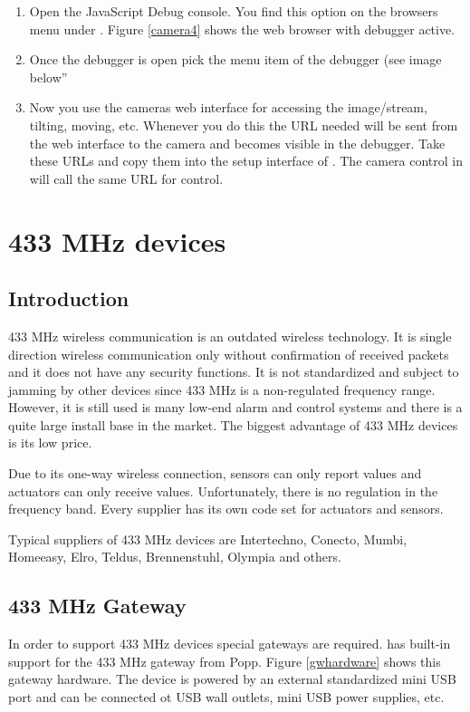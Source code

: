 \begin{enumerate}
\item Open the JavaScript Debug console. You find this option on the browsers menu under
. Figure \ref{camera4} shows the web browser with debugger active.
\item Once the debugger is open pick the menu item  of the debugger (see image below”
\item Now you use the cameras web interface for accessing the image/stream, tilting, moving, 
etc. Whenever you do this the URL needed will be sent from the web interface to the camera 
and becomes visible in the debugger. Take these URLs and copy them into the setup 
interface of . The camera control in \zwave will call the same URL for 
control.
\end{enumerate}

\section {433 MHz devices}

\subsection {Introduction}

433 MHz wireless communication is an outdated wireless technology. It is single direction 
wireless communication only without confirmation of received packets and it does not have 
any security functions. It is not standardized and subject to jamming by other devices 
since 433 MHz is a non-regulated frequency range. However, it is still used is many low-end 
alarm and control systems and there is a quite large install base in the market. The 
biggest advantage of 433 MHz devices is its low price.

Due to its one-way wireless connection, sensors can only report values and actuators can 
only receive values. Unfortunately, there is no regulation in the frequency band. 
Every supplier has its own code set for actuators and sensors.

Typical suppliers of 433 MHz devices are Intertechno, Conecto, Mumbi, Homeeasy, Elro, 
Teldus, Brennenstuhl, Olympia and others.

\subsection {433 MHz Gateway}

In order to support 433 MHz devices special gateways are required. \zway has built-in support 
for the 433 MHz gateway from Popp. Figure \ref{gwhardware} shows this gateway hardware. 
The device is powered by an external standardized mini USB port and can be connected ot 
USB wall outlets, mini USB power supplies, etc.

